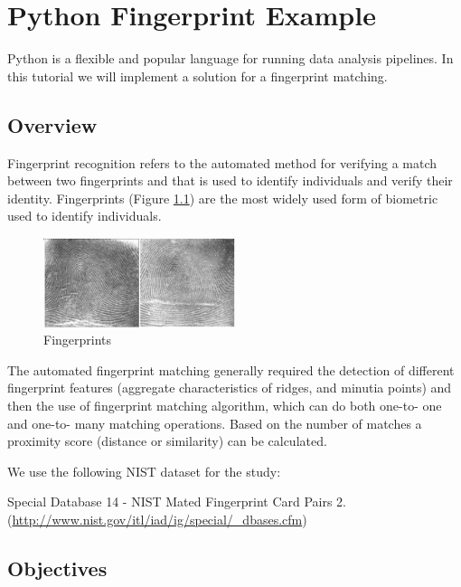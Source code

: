 \chapter{Python Fingerprint Example}
\label{c:python-fingerprint}

Python is a flexible and popular language for running data analysis
pipelines. In this tutorial we will implement a solution for a
fingerprint matching.

\section{Overview}\label{overview}

Fingerprint recognition refers to the automated method for verifying a
match between two fingerprints and that is used to identify
individuals and verify their identity. Fingerprints (Figure
\ref{F:fingerprints}) are the most widely used form of biometric used
to identify individuals.


\begin{figure}[htb]
\centering
\includegraphics[width=0.5\textwidth]{notebooks/fingerprint/fingerprints.png}
\caption{Fingerprints}\label{F:fingerprints}
\end{figure}

The automated fingerprint matching generally required the detection of
different fingerprint features (aggregate characteristics of ridges, and
minutia points) and then the use of fingerprint matching algorithm,
which can do both one-to- one and one-to- many matching operations.
Based on the number of matches a proximity score (distance or
similarity) can be calculated.

We use the following NIST dataset for the study:

Special Database 14 - NIST Mated Fingerprint Card Pairs 2.
(\url{http://www.nist.gov/itl/iad/ig/special/_dbases.cfm})


\section{Objectives}\label{objectives}


